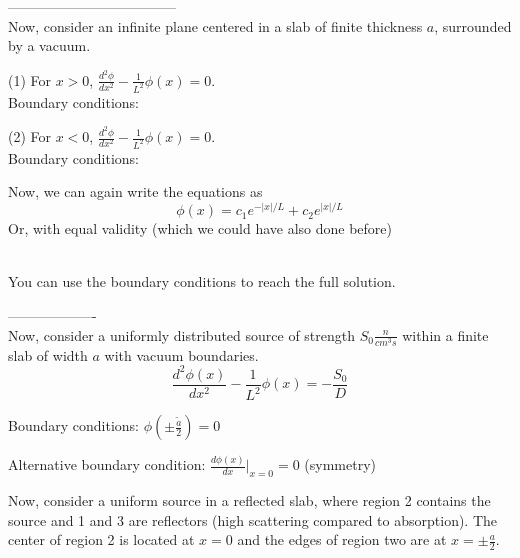 \documentclass[12pt]{article}
\newif\ifeqns
\begin{document}
------------------------------------\\
Now, consider an infinite plane centered in a slab of finite thickness $a$, surrounded by a vacuum.


(1) For $x > 0$, $\frac{d^2\phi}{dx^2} - \frac{1}{L^2}\phi(x) = 0$.\\
%
Boundary conditions: 
\ifeqns
\begin{align*}
\lim\limits_{x\rightarrow 0^+}\vec{J}(x) &= \frac{S_0}{2}\:,\\
%
\phi(\tfrac{\tilde{a}}{2}) &= 0
\end{align*}
\else
\vspace*{6em}
\fi


(2) For $x < 0$, $\frac{d^2\phi}{dx^2} - \frac{1}{L^2}\phi(x) = 0$.\\
%
Boundary conditions: 
\ifeqns
\begin{align*}
\lim\limits_{x\rightarrow 0^-}\vec{J}(x) &= -\frac{S_0}{2} \:,\\
%
 \phi(-\tfrac{\tilde{a}}{2}) &= 0
\end{align*}
\else
\vspace*{6em}
\fi

Now, we can again write the equations as
\[\phi(x) = c_1e^{-|x|/L} + c_2e^{|x|/L}\]
Or, with equal validity  (which we could have also done before)
\ifeqns
\[\phi(x) = c_1\cosh(\tfrac{|x|}{L}) + c_2\sinh(\tfrac{|x|}{L})\]
\else
\vspace*{3em}\\
\fi
%
You can use the boundary conditions to reach the full solution.



-------------------\\
Now, consider a uniformly distributed source of strength $S_0 \tfrac{n}{cm^3s}$ within a finite slab of
width $a$ with vacuum boundaries.
%
\begin{equation*}
\frac{d^2\phi(x)}{dx^2} - \frac{1}{L^2}\phi(x) = -\frac{S_0}{D}
\end{equation*}
\ifeqns
\begin{equation*}
\phi(x) = c_1e^{-|x|/L} + c_2e^{|x|/L} + \frac{S_0L^2}{D}
\end{equation*}
\else
\vspace*{3em}
\fi

Boundary conditions: $\phi(\pm\tfrac{\tilde{a}}{2}) = 0$


Alternative boundary condition: $\frac{d\phi(x)}{dx}\Bigr|_{x = 0} = 0$ (symmetry)


Now, consider a uniform source in a reflected slab, where region 2 contains the source and 1 and 3 are reflectors (high scattering compared to absorption). The center of region 2 is located at $x=0$ and the edges of region two are at $x=\pm \frac{a}{2}$.
\end{document}
